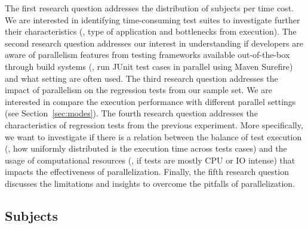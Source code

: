 The first research question addresses the distribution of subjects per
time cost. We are interested in identifying time-consuming test suites
to investigate further their characteristics (\eg, type of application
and bottlenecks from execution).  The second research question
addresses our interest in understanding if developers are aware of
parallelism features from testing frameworks available out-of-the-box
through build systems (\eg, run JUnit test cases in parallel using
Maven Surefire) and what setting are often used. The third research
question addresses the impact of parallelism on the regression tests
from our sample set. We are interested in compare the execution
performance with different parallel settings (see
Section~\ref{sec:modes}). The fourth research question addresses the
characteristics of regression tests from the previous experiment.
More specifically, we want to investigate if there is a relation
between the balance of test execution (\ie, how uniformly distributed
is the execution time across tests cases) and the usage of
computational resources (\ie, if tests are mostly CPU or IO intense)
that impacts the effectiveness of parallelization. Finally, the fifth
research question discusses the limitations and insights to overcome
the pitfalls of parallelization.


\subsection{Subjects}
\label{sec:subjects}

